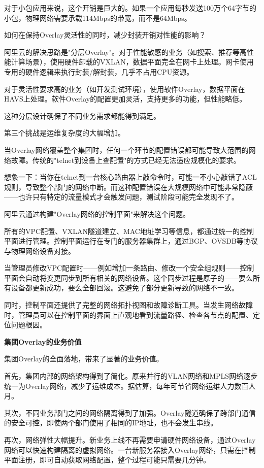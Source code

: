 对于小包应用来说，这个开销是巨大的。如果一个应用每秒发送100万个64字节的小包，物理网络需要承载114Mbps的带宽，而不是64Mbps。

如何在保持Overlay灵活性的同时，减少封装开销对性能的影响？

阿里云的解决思路是"分层Overlay"。对于性能敏感的业务（如搜索、推荐等高性能计算场景），使用硬件卸载的VXLAN，数据平面完全在网卡上处理。网卡使用专用的硬件逻辑来执行封装/解封装，几乎不占用CPU资源。

对于灵活性要求高的业务（如开发测试环境），使用软件Overlay，数据平面在HAVS上处理。软件Overlay的配置更加灵活，支持更多的功能，但性能略低。

这种分层设计确保了不同业务需求都能得到满足。

第三个挑战是运维复杂度的大幅增加。

当Overlay网络覆盖整个集团时，任何一个环节的配置错误都可能导致大范围的网络故障。传统的"telnet到设备上查配置"的方式已经无法适应规模化的要求。

想象一下：当你在telnet到一台核心路由器上敲命令时，可能一不小心敲错了ACL规则，导致整个部门的网络中断。而这种配置错误在大规模网络中可能非常隐蔽——也许只有特定的流量模式才会触发问题，测试阶段可能完全发现不了。

阿里云通过构建"Overlay网络的控制平面"来解决这个问题。

所有的VPC配置、VXLAN隧道建立、MAC地址学习等信息，都通过统一的控制平面进行管理。控制平面运行在专门的服务器集群上，通过BGP、OVSDB等协议与物理网络设备对接。

当管理员修改VPC配置时——例如增加一条路由、修改一个安全组规则——控制平面会自动将变更同步到所有相关的网络设备。这个同步过程是原子的——要么所有设备都更新成功，要么全部回滚。这避免了部分更新导致的网络不一致。

同时，控制平面还提供了完整的网络拓扑视图和故障诊断工具。当发生网络故障时，管理员可以在控制平面的界面上直观地看到流量路径、检查各节点的配置、定位问题根因。

\textbf{集团Overlay的业务价值}

集团Overlay的全面落地，带来了显著的业务价值。

首先，集团内部的网络架构得到了简化。原来并行的VLAN网络和MPLS网络逐步统一为Overlay网络，减少了运维成本。据估算，每年可节省网络运维人力数百人月。

其次，不同业务部门之间的网络隔离得到了加强。Overlay隧道确保了跨部门通信的安全可控，即使两个部门使用了相同的IP地址，也不会发生串线。

再次，网络弹性大幅提升。新业务上线不再需要申请硬件网络设备，通过Overlay网络可以快速构建隔离的虚拟网络。一台新服务器接入Overlay网络，只需在控制平面注册，即可自动获取网络配置，整个过程可能只需要几分钟。

